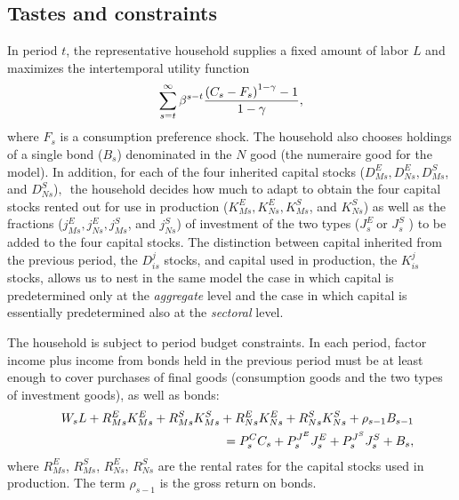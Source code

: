 \documentclass[12pt,fleqn]{article}
\begin{document}
\subsection{\protect\normalsize Tastes and constraints}

{\normalsize In period $t$, the representative household supplies a fixed
amount of labor $L$ and maximizes the intertemporal utility function
\begin{equation}
\sum_{s=t}^{\infty }\beta ^{s-t}\frac{\left( C_{s}-F_{s} \right) ^{1-\gamma }-1}{%
1-\gamma },  \label{utility}
\end{equation}
where $F_s$ is a consumption preference shock.
The household also chooses
holdings of a single bond ($B_s$) denominated in the $N$ good (the numeraire
good for the model). In addition, for each of the four inherited capital
stocks ($D_{Ms}^{E},D_{Ns}^{E},D_{Ms}^{S}$, and $D_{Ns}^{S}$)$,$\ the
household decides how much to adapt to obtain the four capital stocks rented
out for use in production ($K_{Ms}^{E},K_{Ns}^{E},K_{Ms}^{S}$, and $%
K_{Ns}^{S}$) as well as the fractions ($j_{Ms}^{E},j_{Ns}^{E},j_{Ms}^{S}$,
and $j_{Ns}^{S}$) of investment of the two types ($J_{s}^{E}\ $or $J_{s}^{S}$%
) to be added to the four capital stocks. The distinction between capital
inherited from the previous period, the $D_{is}^{j}$ stocks, and capital
used in production, the $K_{is}^{j}$ stocks, allows us to nest in the same
model the case in which capital is predetermined only at the \emph{aggregate}
level and the case in which capital is essentially predetermined also at the \emph{%
sectoral} level. }

{\normalsize The household is subject to period budget constraints. In each
period, factor income plus income from bonds held in the previous period
must be at least enough to cover purchases of final goods (consumption goods
and the two types of investment goods), as well as bonds:
\begin{eqnarray}
&&W_{s} L+R^E_{Ms} K_{Ms}^E +R^S_{Ms}K^S_{Ms}+R^E_{Ns} K_{Ns}^E
+R^S_{Ns}K^S_{Ns}+\rho _{s-1}B_{s-1}  \notag \\
&& =P_{s}^{C}C_{s}+P_{s}^{J^{E}}J_{s}^{E}+P_{s}^{J^{S}}J_{s}^{S}+B_{s},
\end{eqnarray}
where $R^E_{Ms}$, $R^S_{Ms}$, $R^E_{Ns}$, $R^S_{Ns}$ are the rental rates
for the capital stocks used in production. The term $\rho _{s-1}$ is the
gross return on bonds.  }
\end{document}
